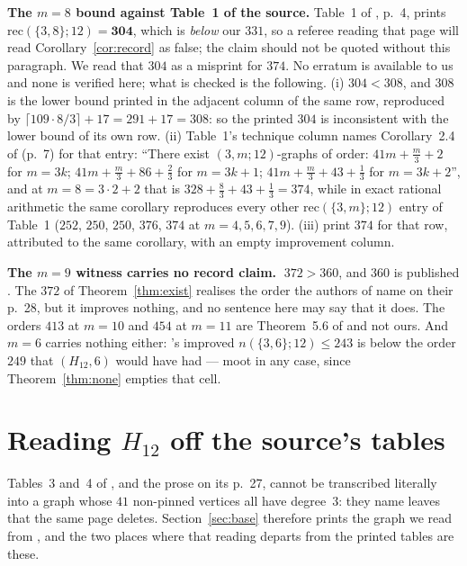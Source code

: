\documentclass[11pt]{amsart}
\theoremstyle{remark}
\begin{document}
\medskip
\noindent\textbf{The $m=8$ bound against Table~1 of the source.}
Table~1 of \cite{AAB}, p.~4, prints $\mathrm{rec}(\{3,8\};12)=\mathbf{304}$, which is
\emph{below} our $331$, so a referee reading that page will read
Corollary~\ref{cor:record} as false; the claim should not be quoted without this paragraph. We
read that $304$ as a misprint for $374$. No erratum is available to us and none is verified
here; what is checked is the following. (i) $304<308$, and $308$ is the lower bound printed in
the adjacent column of the same row, reproduced by
$\lceil 109\cdot8/3\rceil+17=291+17=308$: so the printed $304$ is inconsistent with the lower
bound of its own row. (ii) Table~1's technique column names Corollary~2.4 of \cite{AAB} (p.~7)
for that entry: ``There exist $(3,m;12)$-graphs of order: $41m+\frac{m}{3}+2$ for $m=3k$;
$41m+\frac{m}{3}+86+\frac{2}{3}$ for $m=3k+1$; $41m+\frac{m}{3}+43+\frac{1}{3}$ for $m=3k+2$'',
and at $m=8=3\cdot2+2$ that is $328+\frac83+43+\frac13=374$, while in exact rational arithmetic
the same corollary reproduces every other $\mathrm{rec}(\{3,m\};12)$ entry of Table~1 ($252$,
$250$, $250$, $376$, $374$ at $m=4,5,6,7,9$). (iii) \cite{GJV} print $374$ for that row,
attributed to the same corollary, with an empty improvement column.

\medskip
\noindent\textbf{The $m=9$ witness carries no record claim.}
$\;372>360$, and $360$ is published \cite{GJV}. The $372$ of Theorem~\ref{thm:exist} realises
the order the authors of \cite{AAB} name on their p.~28, but it improves nothing, and no
sentence here may say that it does. The orders $413$ at $m=10$ and $454$ at $m=11$ are
Theorem~5.6 of \cite{AAB} and not ours. And $m=6$ carries nothing either:
\cite{GJV}'s improved $n(\{3,6\};12)\le 243$ is below the order $249$ that $(H_{12},6)$ would
have had --- moot in any case, since Theorem~\ref{thm:none} empties that cell.

\section{Reading $H_{12}$ off the source's tables}\label{sec:corr}

Tables~3 and~4 of \cite{AAB}, and the prose on its p.~27, cannot be transcribed literally into a
graph whose $41$ non-pinned vertices all have degree~$3$: they name leaves that the same page
deletes. Section~\ref{sec:base} therefore prints the graph we read from
\cite[Figure~16]{AAB}, and the two places where that reading departs from the printed tables are
these.
\end{document}
